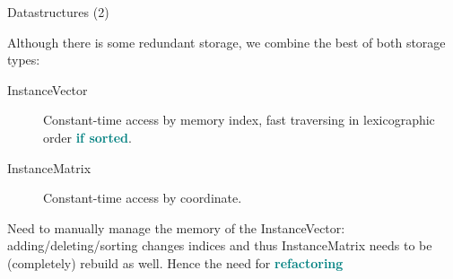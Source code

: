 \documentclass[11pt]{beamer}
\renewcommand{\bold}[1]{\textcolor{teal}{\textbf{#1}}}
\begin{document}

\begin{frame}{Datastructures (2)}

Although there is some redundant storage, we combine the best of both storage types:\medskip
\begin{description}
\item[InstanceVector] Constant-time access by memory index, fast traversing in lexicographic order \bold{if sorted}.
\item[InstanceMatrix] Constant-time access by coordinate.
\end{description}\medskip
Need to manually manage the memory of the InstanceVector: adding/deleting/sorting changes indices and thus InstanceMatrix needs to be (completely) rebuild as well. Hence the need for \bold{refactoring}

\end{frame}

\end{document}
